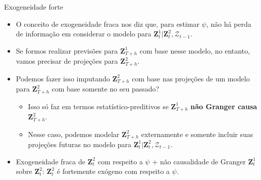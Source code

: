 \documentclass[11pt]{beamer}
\begin{document}
\begin{frame}{Exogeneidade forte}
	\begin{itemize}
		\item O conceito de exogeneidade fraca nos diz que, para estimar $\psi$, não há perda de informação em considerar o modelo para $\boldsymbol{Z}_t^1|\boldsymbol{Z}^2_t,\mathcal{Z}_{t-1}$.
		\item Se formos realizar previsões para $\boldsymbol{Z}_{T+h}^1$ com base nesse  modelo, no entanto, vamos precisar de projeções para $\boldsymbol{Z}^2_{T+h}$.
		\item Podemos fazer isso imputando $\boldsymbol{Z}^2_{T+h}$ com base nas projeções de um modelo para $\boldsymbol{Z}^2_{T+h}$ com base somente no seu passado?
		\begin{itemize}
			\item Isso só faz em termos estatístico-preditivos se $\boldsymbol{Z}^1_{T+h}$ \textbf{não Granger causa} $\boldsymbol{Z}^2_{T+h}$.
			\item Nesse caso, podemos modelar $\boldsymbol{Z}^2_{T+h}$ externamente e somente incluir suas projeções futuras no modelo para $\boldsymbol{Z}_t^1|\boldsymbol{Z}^2_t,\mathcal{Z}_{t-1}$.
		\end{itemize}
		\item Exogeneidade fraca de $\boldsymbol{Z}^2_t$ com respeito a $\psi$ + não causalidade de Granger $\boldsymbol{Z}^1_t$ sobre $\boldsymbol{Z}^2_t$: $\boldsymbol{Z}^2_t$ é {\color{blue}fortemente exógeno} com respeito a $\psi$.
	\end{itemize}
\end{frame}
\end{document}
